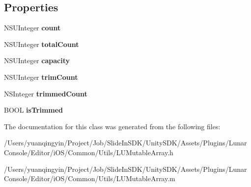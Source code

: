 \subsection*{Properties}
\begin{DoxyCompactItemize}
\item 
\mbox{\label{interface_l_u_mutable_array_a699e2f85df34eaac72d3cc7dd5bd27d5}} 
N\+S\+U\+Integer {\bfseries count}
\item 
\mbox{\label{interface_l_u_mutable_array_a26397135a19ddcbfdea4450abf3c514c}} 
N\+S\+U\+Integer {\bfseries total\+Count}
\item 
\mbox{\label{interface_l_u_mutable_array_a61d9c272462f44a04adce74b807eb773}} 
N\+S\+U\+Integer {\bfseries capacity}
\item 
\mbox{\label{interface_l_u_mutable_array_aae58b3eeefff3d302c24adb4aed71db2}} 
N\+S\+U\+Integer {\bfseries trim\+Count}
\item 
\mbox{\label{interface_l_u_mutable_array_a7dbd7f9bdb1da44d7cad102ae710c672}} 
N\+S\+Integer {\bfseries trimmed\+Count}
\item 
\mbox{\label{interface_l_u_mutable_array_a5d2af438c6bd5339fd5f33edb2b2bf46}} 
B\+O\+OL {\bfseries is\+Trimmed}
\end{DoxyCompactItemize}


The documentation for this class was generated from the following files\+:\begin{DoxyCompactItemize}
\item 
/\+Users/yuanqingyin/\+Project/\+Job/\+Slide\+In\+S\+D\+K/\+Unity\+S\+D\+K/\+Assets/\+Plugins/\+Lunar\+Console/\+Editor/i\+O\+S/\+Common/\+Utils/L\+U\+Mutable\+Array.\+h\item 
/\+Users/yuanqingyin/\+Project/\+Job/\+Slide\+In\+S\+D\+K/\+Unity\+S\+D\+K/\+Assets/\+Plugins/\+Lunar\+Console/\+Editor/i\+O\+S/\+Common/\+Utils/L\+U\+Mutable\+Array.\+m\end{DoxyCompactItemize}

